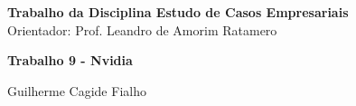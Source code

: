 \documentclass{article}
\begin{document}
\begin{flushright}
  \textbf{Trabalho da Disciplina Estudo de Casos Empresariais} \\
  Orientador: Prof. Leandro de Amorim Ratamero
\end{flushright}

{\large\bfseries Trabalho 9 - Nvidia \par}

{\large Guilherme Cagide Fialho \par}

% 

% 

% 

% 

% 

% 

% 

% 

% 

% 
\end{document}
